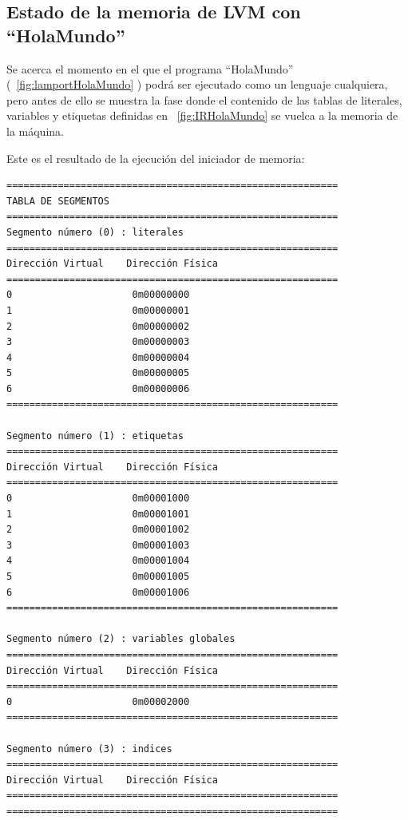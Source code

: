 \subsection{Estado de la memoria de LVM con ``HolaMundo''}
Se acerca el momento en el que el programa ``HolaMundo'' (~\ref{fig:lamportHolaMundo} ) podrá ser ejecutado como un lenguaje cualquiera, pero antes de ello se muestra la fase donde el contenido de las tablas de literales, variables y etiquetas definidas en ~\ref{fig:IRHolaMundo} se vuelca a la memoria de la máquina.


\noindent
Este es el resultado de la ejecución del iniciador de memoria:
\begin{verbatim}
==========================================================
TABLA DE SEGMENTOS
==========================================================
Segmento número (0) : literales
==========================================================
Dirección Virtual    Dirección Física    
==========================================================
0                     0m00000000            
1                     0m00000001            
2                     0m00000002            
3                     0m00000003            
4                     0m00000004            
5                     0m00000005            
6                     0m00000006            
==========================================================

Segmento número (1) : etiquetas
==========================================================
Dirección Virtual    Dirección Física    
==========================================================
0                     0m00001000            
1                     0m00001001            
2                     0m00001002            
3                     0m00001003            
4                     0m00001004            
5                     0m00001005            
6                     0m00001006            
==========================================================

Segmento número (2) : variables globales
==========================================================
Dirección Virtual    Dirección Física    
==========================================================
0                     0m00002000            
==========================================================

Segmento número (3) : indices
==========================================================
Dirección Virtual    Dirección Física    
==========================================================
==========================================================


\end{verbatim}
